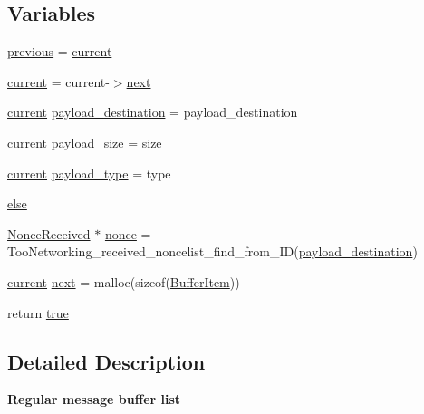 \subsection*{Variables}
\begin{DoxyCompactItemize}
\item 
\hyperlink{group__TOONETWORKING__SIMPLE__BUFFER_gaf1966d7084d2373905ae510e8f04a581}{previous} = \hyperlink{group__TOONETWORKING__SIMPLE__BUFFER_gae8b515cceb310a575b6c2677ba93ea7e}{current}
\item 
\hyperlink{group__TOONETWORKING__SIMPLE__BUFFER_gae8b515cceb310a575b6c2677ba93ea7e}{current} = current-\/$>$\hyperlink{group__TOONETWORKING__SIMPLE__BUFFER_gaa775cb983053439822fe541f3fa9166a}{next}
\item 
\hyperlink{group__TOONETWORKING__SIMPLE__BUFFER_gae8b515cceb310a575b6c2677ba93ea7e}{current} \hyperlink{group__TOONETWORKING__SIMPLE__BUFFER_ga76db772dc25d4b2f5eb800e93ca3fd0b}{payload\+\_\+destination} = payload\+\_\+destination
\item 
\hyperlink{group__TOONETWORKING__SIMPLE__BUFFER_gae8b515cceb310a575b6c2677ba93ea7e}{current} \hyperlink{group__TOONETWORKING__SIMPLE__BUFFER_gaca16f9091ec66e37bff7fc67b75eba73}{payload\+\_\+size} = size
\item 
\hyperlink{group__TOONETWORKING__SIMPLE__BUFFER_gae8b515cceb310a575b6c2677ba93ea7e}{current} \hyperlink{group__TOONETWORKING__SIMPLE__BUFFER_gab2ced9a16c7ca839c034e133999f2f40}{payload\+\_\+type} = type
\item 
\hyperlink{group__TOONETWORKING__SIMPLE__BUFFER_ga0544c3fe466e421738dae463968b70ba}{else}
\item 
\hyperlink{structNonceReceived}{Nonce\+Received} $\ast$ \hyperlink{group__TOONETWORKING__SIMPLE__BUFFER_ga8fc64ce47dc28f47b3317ae1051e4359}{nonce} = Too\+Networking\+\_\+received\+\_\+noncelist\+\_\+find\+\_\+from\+\_\+\+ID(\hyperlink{group__TOONETWORKING__SIMPLE__BUFFER_ga76db772dc25d4b2f5eb800e93ca3fd0b}{payload\+\_\+destination})
\item 
\hyperlink{group__TOONETWORKING__SIMPLE__BUFFER_gae8b515cceb310a575b6c2677ba93ea7e}{current} \hyperlink{group__TOONETWORKING__SIMPLE__BUFFER_gaa775cb983053439822fe541f3fa9166a}{next} = malloc(sizeof(\hyperlink{structBufferItem}{Buffer\+Item}))
\item 
return \hyperlink{group__TOONETWORKING__SIMPLE__BUFFER_ga930920b2bc42824a5c03be681830f4b2}{true}
\end{DoxyCompactItemize}


\subsection{Detailed Description}
{\bfseries Regular message buffer list} 

